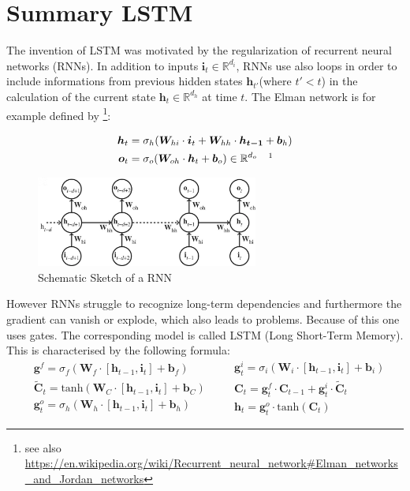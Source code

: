\section{Summary LSTM \cite{Vlachas}}

	The invention of LSTM was motivated by the regularization of recurrent neural networks (RNNs). In addition to inputs $\bm{i}_t \in \mathbb{R}^{d_i}$, RNNs use also loops in order to include informations from previous hidden states $\bm{h}_{t'}$(where $t'<t$) in the calculation of the current state $\bm{h}_t \in \mathbb{R}^{d_h}$ at time $t$. The Elman network \cite{Elman} is for example defined by \footnote{see also \url{https://en.wikipedia.org/wiki/Recurrent_neural_network\#Elman_networks_and_Jordan_networks}}:
	\begin{figure}[h]
	\begin{minipage}[h][3cm][t]{7cm}
	\begin{align}
		\bm{h}_t&=\sigma_h(\bm{W}_{hi}\cdot\bm{i}_t+\bm{W}_{hh}\cdot\bm{h_{t-1}}+\bm{b}_h)\\
		\bm{o}_t&=\sigma_o(\bm{W}_{oh}\cdot\bm{h}_t+\bm{b}_o) \in \mathbb{R}^{d_o} \quad \footnotemark
	\end{align}
	\vfill
	\caption{Schematic Sketch of a RNN \cite{Vlachas}}
	\end{minipage}
	\begin{minipage}[h][3cm][c]{7.5cm}
		\centering
		\includegraphics[width=7.3cm]{images/RNN_Vlachas_cropped.png}
	\end{minipage}
	\end{figure}
	However RNNs struggle to recognize long-term dependencies and furthermore the gradient can vanish or explode, which also leads to problems. Because of this one uses gates. The corresponding model is called LSTM (Long Short-Term Memory). This is characterised by the following formula:
	\begin{equation}
	\begin{aligned}
		&\bm{g}^f = \sigma_f(\bm{W}_f\cdot[\bm{h}_{t-1}, \bm{i}_t]+\bm{b}_f)\\
		&\tilde{\bm{C}}_t = \text{tanh}(\bm{W}_C\cdot[\bm{h}_{t-1}, \bm{i}_t]+\bm{b}_C)\\
		&\bm{g}_t^o=\sigma_h(\bm{W}_h\cdot[\bm{h}_{t-1}, \bm{i}_t]+\bm{b}_h)
	\end{aligned}
	\quad
	\begin{aligned}
		&\bm{g}_t^i=\sigma_i(\bm{W}_i\cdot[\bm{h}_{t-1}, \bm{i}_t]+\bm{b}_i)\\
		&\bm{C}_t = \bm{g}_t^f\cdot\bm{C}_{t-1} +\bm{g}_t^i\cdot\tilde{\bm{C}}_t\\
		&\bm{h}_t = \bm{g}_t^o\cdot\text{tanh}(\bm{C}_t)
	\end{aligned}
	\end{equation}
